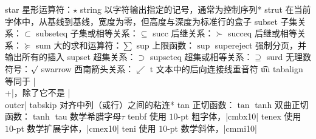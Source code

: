 \capcs star {星形运算符：$\star$}{}{}
\capcs string {以字符输出指定的记号，通常为控制序列}*{}
\capcs strut {在当前字体中，从基线到基线，宽度为零，但高度与深度为标准行的盒子}{}{}
\capcs subset {子集关系：$\subset$}{}{}
\capcs subseteq {子集或相等关系：$\subseteq$}{}{}
\capcs succ {后继关系：$\succ$}{}{}
\capcs succeq {后继或相等关系：$\succeq$}{}{}
\capcs sum {大的求和运算符：$\sum$}{}{}
\capcs sup {上限函数：$\sup$}{}{}
\capcs supereject {强制分页，并输出所有的插入}{}{}
\capcs supset {超集关系：$\supset$}{}{}
\capcs supseteq {超集或相等关系：$\supseteq$}{}{}
\capcs surd {无理数符号：$\surd$}{}{}
\capcs swarrow {西南箭头关系：$\swarrow$}{}{}
\capcs t {文本中的后向连接线重音符 \t uu}{}{}
\capcs tabalign {等同于 |\\+|，除了它不是 |\\outer|}{}{}
\capcs tabskip {对齐中列（或行）之间的粘连}*{}
\capcs tan {正切函数：$\tan$}{}{}
\capcs tanh {双曲正切函数：$\tanh$}{}{}
\capcs tau {数学希腊字母$\tau$}{}{}
\capcs tenbf {使用 $10$-pt 粗字体，|cmbx10|}{}{}
\capcs tenex {使用 $10$-pt 数学扩展字体，|cmex10|}{}{}
\capcs teni {使用 $10$-pt 数学斜体，|cmmi10|}{}{}
